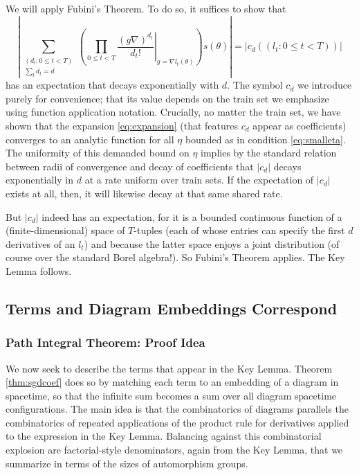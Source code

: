 \documentclass{article}
\newcommand{\wrap}[1]{\left(#1\right)}
\newcommand{\wabs}[1]{\left|#1\right|}
\begin{document}
            We will apply Fubini's Theorem.  To do so, it suffices to show that   
            $$
                \wabs{
                    \sum_{\substack{(d_t: 0\leq t<T) \\ \sum_t d_t = d}}
                    \wrap{
                        \prod_{0 \leq t < T} \left.
                            \frac{(g \nabla)^{d_t}}{d_t!}
                        \right|_{g=\nabla l_t(\theta)}
                    } s (\theta)
                }
                = \wabs{c_d((l_t: 0\leq t<T))} 
            $$
            has an expectation that decays exponentially with $d$.  The symbol
            $c_d$ we introduce purely for convenience; that its value depends
            on the train set we emphasize using function application
            notation.  Crucially, no matter the train set, we have shown
            that the expansion \ref{eq:expansion} (that features $c_d$ appear
            as coefficients) converges to an analytic function for all $\eta$
            bounded as in condition \ref{eq:smalleta}.  The uniformity of this
            demanded bound on $\eta$ implies by the standard relation between
            radii of convergence and decay of coefficients that $\wabs{c_d}$
            decays exponentially in $d$ at a rate uniform over train sets.
            If the expectation of $\wabs{c_d}$ exists at all, then, it will
            likewise decay at that same shared rate.
            
            But $\wabs{c_d}$ indeed has an expectation, for it is a bounded
            continuous function of a (finite-dimensional) space of $T$-tuples
            (each of whose entries can specify the first $d$ derivatives of an
            $l_t$) and because the latter space enjoys a joint distribution (of
            course over the standard Borel algebra!).  So Fubini's Theorem
            applies. The Key Lemma
            follows.   

    \subsection{Terms and Diagram Embeddings Correspond}
        \subsubsection*{Path Integral Theorem: Proof Idea}
            We now seek to describe the terms that appear in the Key Lemma. 
            Theorem \ref{thm:sgdcoef} does so by matching each term to an
            embedding of a diagram in spacetime, so that the infinite sum
            becomes a sum over all diagram spacetime configurations.
            The main idea is that the combinatorics of diagrams parallels the
            combinatorics of repeated applications of the product rule for
            derivatives applied to the expression in the Key Lemma. 
            Balancing against this combinatorial explosion are factorial-style 
            denominators, again from the Key Lemma, that we summarize in terms
            of the sizes of automorphism groups.
\end{document}
